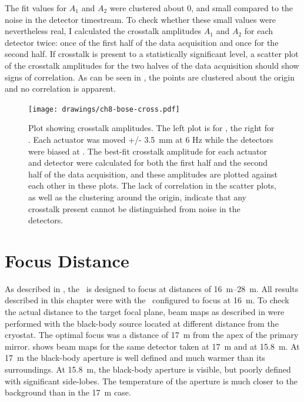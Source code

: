 The fit values for $A_1$ and $A_2$ were clustered about 0, and small compared to the noise in the detector timestream.
To check whether these small values were nevertheless real, I calculated the crosstalk amplitudes $A_1$ and $A_2$ for each detector twice: once of the first half of the data acquisition and once for the second half.
If crosstalk is present to a statistically significant level, a scatter plot of the crosstalk amplitudes for the two halves of the data acquisition should show signs of correlation.
As can be seen in , the points are clustered about the origin and no correlation is apparent.

\begin{figure}
\centering
\texttt{[image: drawings/ch8-bose-cross.pdf]}
\caption[Plot showing crosstalk amplitudes]{
Plot showing crosstalk amplitudes.
The left plot is for , the right for .
Each actuator was moved +/- \SI{3.5}{\mm} at 6 Hz while the detectors were biased at \SOC.
The best-fit crosstalk amplitude for each actuator and detector were calculated for both the first half and the second half of the data acquisition, and these amplitudes are plotted against each other in these plots.
The lack of correlation in the scatter plots, as well as the clustering around the origin, indicate that any crosstalk present cannot be distinguished from noise in the detectors.
}
\label{fig:ch8-bose-cross}
\end{figure}

\section{Focus Distance}\label{sec:ch8-focus-distance}

As described in , the \Imager\ is designed to focus at distances of \SIrange{16}{28}{\m}.
All results described in this chapter were with the \Imager\ configured to focus at 16~m.
To check the actual distance to the target focal plane, beam maps as described in  were performed with the black-body source located at different distance from the cryostat.
The optimal focus was a distance of \SI{17}{\m} from the apex of the primary mirror.
 shows beam maps for the same detector taken at \SI{17}{\m} and at \SI{15.8}{\m}.
At \SI{17}{\m} the black-body aperture is well defined and much warmer than its surroundings.
At \SI{15.8}{\m}, the black-body aperture is visible, but poorly defined with significant side-lobes.
The temperature of the aperture is much closer to the background than in the \SI{17}{\m} case.

